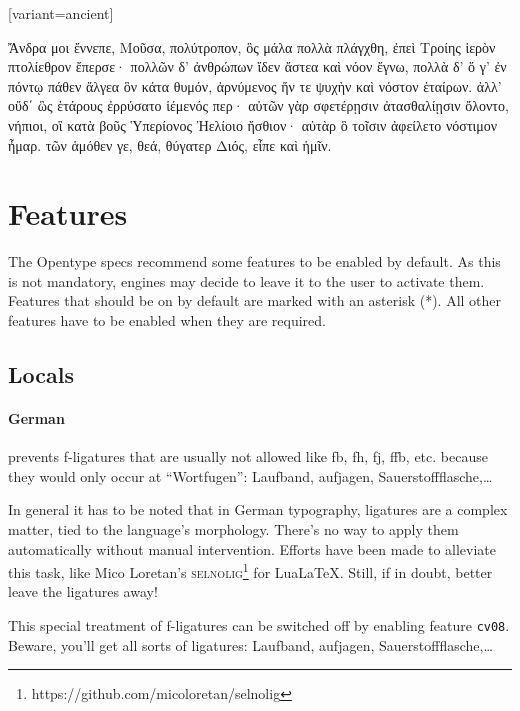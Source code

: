 \documentclass[pagesize,DIV14]{scrartcl}
\begin{document}
\begin{multicols}{2}
\begin{greek}[variant=ancient]
    {
    Ἄνδρα μοι ἔννεπε, Μοῦσα, πολύτροπον, ὃς μάλα πολλὰ
    πλάγχθη, ἐπεὶ Τροίης ἱερὸν πτολίεθρον ἔπερσε·
    πολλῶν δ’ ἀνθρώπων ἴδεν ἄστεα καὶ νόον ἔγνω,
    πολλὰ δ’ ὅ γ’ ἐν πόντῳ πάθεν ἄλγεα ὃν κάτα θυμόν,
    ἀρνύμενος ἥν τε ψυχὴν καὶ νόστον ἑταίρων.
    ἀλλ’ οὔδ΄ ὣς ἑτάρους ἐρρύσατο ἱέμενός περ·
    αὐτῶν γὰρ σφετέρῃσιν ἀτασθαλίῃσιν ὄλοντο,
    νήπιοι, οἳ κατὰ βοῦς Ὑπερίονος Ἠελίοιο
    ἤσθιον· αὐτὰρ ὃ τοῖσιν ἀφείλετο νόστιμον ἦμαρ.
    τῶν ἁμόθεν γε, θεά, θύγατερ Διός, εἶπε καὶ ἡμῖν. \par

}
\end{greek}

\end{multicols}

\clearpage

\section{Features}

The Opentype specs recommend some features to be enabled by default. As this is not mandatory, engines may decide to leave it to the user to activate them. Features that should be on by default are marked with an asterisk (*). All other features have to be enabled when they are required.

\subsection{Locals}
\paragraph*{German} prevents f-ligatures that are usually not allowed like fb, fh, fj, ffb, etc. because they would only occur at \enquote{Wortfugen}: {Laufband, aufjagen, Sauerstoffflasche,…}\par
In general it has to be noted that in German typography, ligatures are a complex matter, tied to the language’s morphology. There’s no way to apply them automatically without manual intervention. Efforts have been made to alleviate this task, like Mico Loretan’s \textsc{selnolig}\footnote{https://github.com/micoloretan/selnolig} for LuaLaTeX. Still, if in doubt, better leave the ligatures away!\par
This special treatment of f-ligatures can be switched off by enabling feature \texttt{cv08}. Beware, you’ll get all sorts of ligatures:  {Laufband, aufjagen, Sauerstoffflasche,…}
\end{document}
